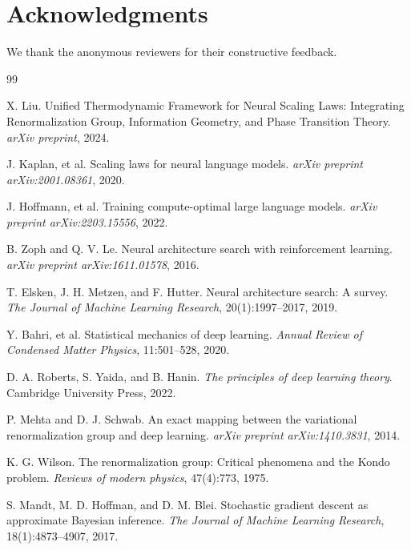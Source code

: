 \documentclass[11pt, a4paper]{article}
\theoremstyle{definition}
\begin{document}
\section*{Acknowledgments}
We thank the anonymous reviewers for their constructive feedback. 

\begin{thebibliography}{99}

X. Liu.
\newblock Unified Thermodynamic Framework for Neural Scaling Laws: Integrating Renormalization Group, Information Geometry, and Phase Transition Theory.
\newblock \emph{arXiv preprint}, 2024.

J. Kaplan, et al. 
\newblock Scaling laws for neural language models. 
\newblock \emph{arXiv preprint arXiv:2001.08361}, 2020.

J. Hoffmann, et al.
\newblock Training compute-optimal large language models. 
\emph{arXiv preprint arXiv:2203.15556}, 2022.

B. Zoph and Q. V. Le.
\newblock Neural architecture search with reinforcement learning. 
\newblock \emph{arXiv preprint arXiv:1611.01578}, 2016.

T. Elsken, J. H. Metzen, and F. Hutter.
\newblock Neural architecture search: A survey. 
\newblock \emph{The Journal of Machine Learning Research}, 20(1):1997--2017, 2019.

Y. Bahri, et al.
\newblock Statistical mechanics of deep learning. 
\newblock \emph{Annual Review of Condensed Matter Physics}, 11:501--528, 2020.

D. A. Roberts, S. Yaida, and B. Hanin.
\newblock \emph{The principles of deep learning theory}. 
\newblock Cambridge University Press, 2022.

P. Mehta and D. J. Schwab.
\newblock An exact mapping between the variational renormalization group and deep learning. 
\newblock \emph{arXiv preprint arXiv:1410.3831}, 2014.

K. G. Wilson.
\newblock The renormalization group: Critical phenomena and the Kondo problem.
\newblock \emph{Reviews of modern physics}, 47(4):773, 1975.

S. Mandt, M. D. Hoffman, and D. M. Blei.
\newblock Stochastic gradient descent as approximate Bayesian inference.
\newblock \emph{The Journal of Machine Learning Research}, 18(1):4873--4907, 2017.


\end{thebibliography}
\end{document}
